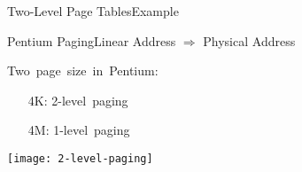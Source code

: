 \begin{frame}{Two-Level Page Tables}{Example}
  \begin{center}
  \end{center}
\end{frame}

\begin{frame}{Pentium Paging}{Linear Address $\Rightarrow$ Physical Address}
  \begin{minipage}{.4\textwidth}
    \mbox{Two page size in Pentium:}
    \begin{small}
      \begin{itemize}
      \item[4K:] \mbox{2-level paging}%
      \item[4M:] \mbox{1-level paging}%
      \end{itemize}
    \end{small}
    \begin{center}
      \texttt{[image: 2-level-paging]}
    \end{center}
  \end{minipage}\quad
  \begin{minipage}{.5\textwidth}
    \begin{center}
    \end{center}
  \end{minipage}
\end{frame}

